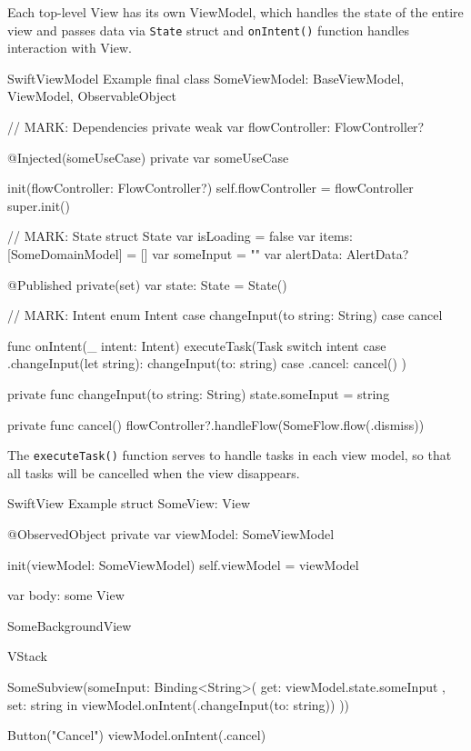 \documentclass[
  biblatex = false,
  language=english,
  figures=false,
  sourcecodes,
  glossaries,
  index
]{kidiplom}
\begin{document}
Each top-level View has its own ViewModel, which handles the state of the entire view and passes data via \texttt{State} struct and \texttt{onIntent()} function handles interaction with View.

\begin{kicode}{Swift}{}{ViewModel Example}
final class SomeViewModel: BaseViewModel, ViewModel, ObservableObject {

    // MARK: Dependencies
    private weak var flowController: FlowController?

    @Injected(\.someUseCase) private var someUseCase

    init(flowController: FlowController?) {
        self.flowController = flowController
        super.init()
    }

    // MARK: State
    struct State {
        var isLoading = false
        var items: [SomeDomainModel] = []
        var someInput = ""
        var alertData: AlertData?
    }

    @Published private(set) var state: State = State()

    // MARK: Intent
    enum Intent {
        case changeInput(to string: String)
        case cancel
    }

    func onIntent(_ intent: Intent)  {
        executeTask(Task {
            switch intent {
            case .changeInput(let string): changeInput(to: string)
            case .cancel: cancel()
            }
        })
    }

    private func changeInput(to string: String) {
        state.someInput = string
    }

    private func cancel() {
        flowController?.handleFlow(SomeFlow.flow(.dismiss))
    }
}
\end{kicode}

The \texttt{executeTask()} function serves to handle tasks in each view model, so that all tasks will be cancelled when the view disappears.

\begin{kicode}{Swift}{}{View Example}
struct SomeView: View {

    @ObservedObject private var viewModel: SomeViewModel

    init(viewModel: SomeViewModel) {
        self.viewModel = viewModel
    }

    var body: some View {
        SomeBackgroundView {
            VStack {
                SomeSubview(someInput: Binding<String>(
                    get: { viewModel.state.someInput },
                    set: { string in viewModel.onIntent(.changeInput(to: string)) }
                ))

                Button("Cancel") {
                    viewModel.onIntent(.cancel)
                }
            }
        }
    }
}
\end{kicode}
\end{document}
